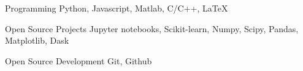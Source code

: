 
\begin{cvskills}

  \cvskill
    {Programming} %
    {Python, Javascript, Matlab, C/C++, LaTeX} %

  \cvskill
    {Open Source Projects}
    {Jupyter notebooks, Scikit-learn, Numpy, Scipy, Pandas, Matplotlib, Dask}

  \cvskill
    {Open Source Development}
    {Git, Github}

\end{cvskills}
